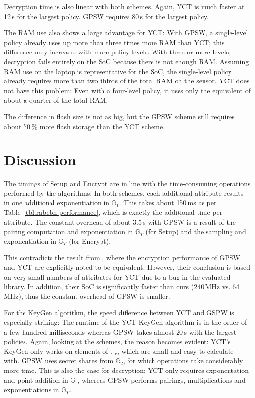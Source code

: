 Decryption time is also linear with both schemes.
Again, YCT is much faster at 12\,s for the largest policy. GPSW requires 80\,s for the largest policy.

The RAM use also shows a large advantage for YCT:
With GPSW, a single-level policy already uses up more than three times more RAM than YCT; this difference only increases with more policy levels.
With three or more levels, decryption fails entirely on the SoC because there is not enough RAM.
Assuming RAM use on the laptop is representative for the SoC, the single-level policy already requires more than two thirds of the total RAM on the sensor.
YCT does not have this problem: Even with a four-level policy, it uses only the equivalent of about a quarter of the total RAM.

The difference in flash size is not as big, but the GPSW scheme still requires about 70\,\% more flash storage than the YCT scheme.


\section{Discussion}
The timings of Setup and Encrypt are in line with the time-consuming operations performed by the algorithms: 
In both schemes, each additional attribute results in one additional exponentiation in $\mathbb{G}_1$.
This takes about 150\,ms as per Table~\ref{tbl:rabebn-performance}, which is exactly the additional time per attribute.
The constant overhead of about 3.5\,s with GPSW is a result of the pairing computation and exponentiation in $\mathbb{G}_T$ (for Setup) and the sampling and exponentiation in $\mathbb{G}_T$ (for Encrypt).

This contradicts the result from \cite{girgenti_feasibility_2019}, where the encryption performance of GPSW and YCT are explicitly noted to be equivalent.
However, their conclusion is based on very small numbers of attributes for YCT due to a bug in the evaluated library.
In addition, their SoC is significantly faster than ours (240\,MHz vs. 64\,MHz), thus the constant overhead of GPSW is smaller.

For the KeyGen algorithm, the speed difference between YCT and GSPW is especially striking: 
The runtime of the YCT KeyGen algorithm is in the order of a few hundred milliseconds whereas GPSW takes almost 20\,s with the largest policies.
Again, looking at the schemes, the reason becomes evident: YCT's KeyGen only works on elements of $\mathbb{F}_r$, which are small and easy to calculate with.
GPSW uses secret shares from $\mathbb{G}_2$, for which operations take considerably more time.
This is also the case for decryption: YCT only requires exponentation and point addition in $\mathbb{G}_1$, whereas GPSW performs pairings, multiplications and exponentiations in $\mathbb{G}_T$.

